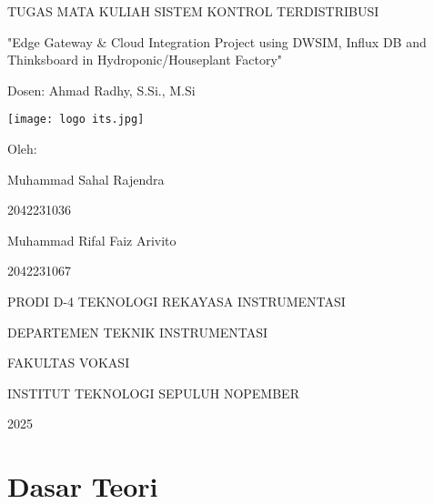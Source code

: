 \documentclass[a4paper, 12pt]{article}
\begin{document}
\begin{titlepage}
    \centering
    {\huge TUGAS MATA KULIAH SISTEM KONTROL TERDISTRIBUSI\par}
    \vspace{1.5cm}
    {\Large "Edge Gateway \& Cloud Integration Project using DWSIM, Influx DB and Thinksboard in Hydroponic/Houseplant Factory"\par}
    \vspace{1.5cm}
    {\large Dosen: Ahmad Radhy, S.Si., M.Si\par}
    \vspace{1cm}
    \texttt{[image: logo its.jpg]}
    \vfill
    {\large Oleh:\par}
    \vspace{0.5cm}
    {\large Muhammad Sahal Rajendra\par}
    {\large 2042231036\par}
    \vspace{0.5cm}
    {\large Muhammad Rifal Faiz Arivito\par}
    {\large 2042231067\par}
    \vfill
    {\large PRODI D-4 TEKNOLOGI REKAYASA INSTRUMENTASI\par}
    {\large DEPARTEMEN TEKNIK INSTRUMENTASI\par}
    {\large FAKULTAS VOKASI\par}
    {\large INSTITUT TEKNOLOGI SEPULUH NOPEMBER\par}
    {\large 2025\par}
\end{titlepage}


\tableofcontents
\newpage
{}


\section{Dasar Teori}
\end{document}
